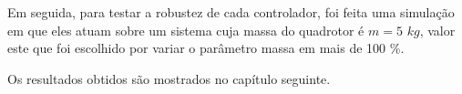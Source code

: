 Em seguida, para testar a robustez de cada controlador, foi feita uma simulação em que eles atuam sobre um sistema cuja massa do quadrotor é $m=5$ $kg$, valor este que foi escolhido por variar o parâmetro massa em mais de 100 \%.

Os resultados obtidos são mostrados no capítulo seguinte.


%
%
%
%
%
%
%
%
